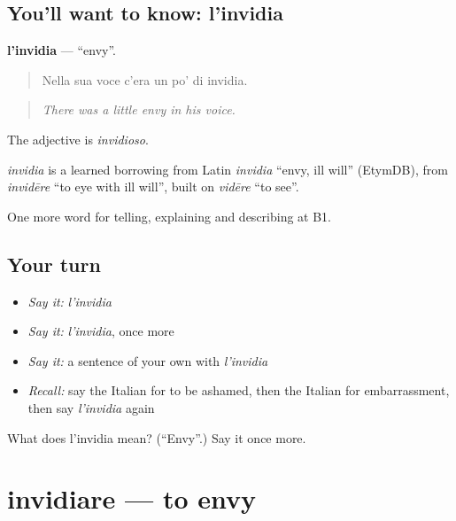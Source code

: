 \subsection*{You'll want to know: l'invidia}
\textbf{l'invidia} — \textquotedblleft{}envy\textquotedblright{}.

\begin{quote}
Nella sua voce c'era un po' di invidia.
\end{quote}

\begin{quote}
\emph{There was a little envy in his voice.}
\end{quote}

The adjective is \emph{invidioso}.

\begin{cousinweb}
\emph{invidia} is a learned borrowing from Latin \emph{invidia} \textquotedblleft{}envy, ill will\textquotedblright{} (EtymDB), from \emph{invidēre} \textquotedblleft{}to eye with ill will\textquotedblright{}, built on \emph{vidēre} \textquotedblleft{}to see\textquotedblright{}.
\end{cousinweb}

\begin{grammarlens}[title={What you've built}]
One more word for telling, explaining and describing at B1.
\end{grammarlens}

\subsection*{Your turn}
\begin{itemize}
\raggedright
  \item \emph{Say it:} \emph{l'invidia}
  \item \emph{Say it:} \emph{l'invidia}, once more
  \item \emph{Say it:} a sentence of your own with \emph{l'invidia}
  \item \emph{Recall:} say the Italian for to be ashamed, then the Italian for embarrassment, then say \emph{l'invidia} again
\end{itemize}

\begin{tcolorbox}[breakable,colback=teal!4,colframe=teal!35!black,title={Before you move on}]
What does l'invidia mean? (\textquotedblleft{}Envy\textquotedblright{}.) Say it once more.
\end{tcolorbox}
\section[invidiare]{invidiare — to envy}

